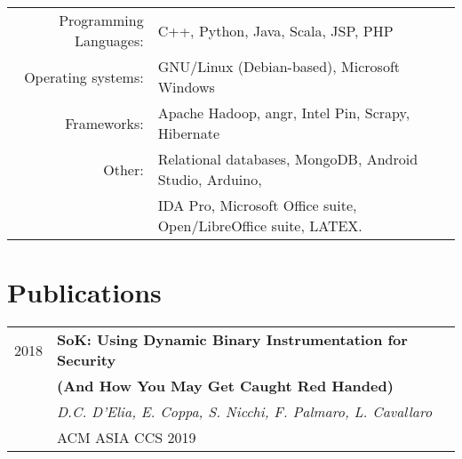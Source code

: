 \documentclass[a4paper,10pt]{article} %
\begin{document}
 \begin{tabular}{rl}
 Programming Languages: &  C++, Python, Java, Scala, JSP, PHP\setmainfont[SmallCapsFont=Fontin-SmallCaps.otf]{Fontin-Regular.otf}\\
Operating systems: & GNU/Linux (Debian-based), Microsoft Windows \\
Frameworks: & Apache Hadoop, angr, Intel Pin, Scrapy, Hibernate \\
 Other: &  Relational databases, MongoDB, Android Studio, Arduino, \\
 & IDA Pro, Microsoft Office suite, Open/LibreOffice suite, LATEX.
 \end{tabular}


\section{Publications}

\begin{tabular}{rl}	


2018 & \textbf{SoK: Using Dynamic Binary Instrumentation for Security} \\ & \textbf{(And How You May Get Caught Red Handed)} \\
& \textit{D.C. D'Elia, E. Coppa, S. Nicchi, F. Palmaro, L. Cavallaro} \\
&  ACM ASIA CCS 2019




\end{tabular}
\end{document}

